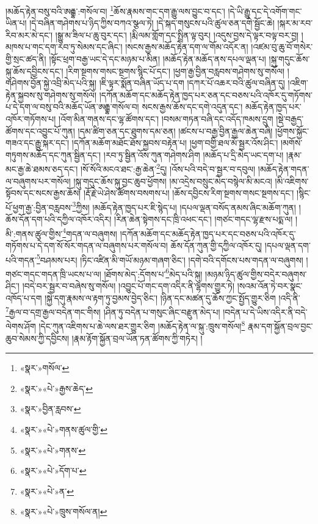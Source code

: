 །མཆོད་རྟེན་བསུ་བའི་ཨརྒྷ་:གསོལ་བ། \footnote{«སྣར་»གསོལ་}ཆོས་རྣམས་གང་དག་རྒྱུ་ལས་བྱུང་བ་དང་། །དེ་ཡི་རྒྱུ་དང་དེ་འགོག་གང་ཡིན་པ། །དེ་བཞིན་གཤེགས་པ་ཉིད་ཀྱིས་བཀའ་སྩལ་ཏེ། །དེ་སྐད་གསུངས་པའི་ཚུལ་ཅན་དགེ་སྦྱོང་ཆེ། །སྐར་མ་རབ་རིབ་མར་མེ་དང་། །སྒྱུ་མ་ཟིལ་པ་ཆུ་བུར་དང་། །རྨི་ལམ་གློག་དང་སྤྲིན་ལྟ་བུར། །འདུས་བྱས་དེ་ལྟར་བལྟ་བར་བྱ། །
མཁས་པ་གང་དག་རབ་ཏུ་སེམས་དང་ཞིང་། །སངས་རྒྱས་མཆོད་རྟེན་དག་ལ་གོམ་འདོར་ན། །འཛམ་བུ་ཆུ་བོ་གསེར་གྱི་སྲང་ཚད་ནི། །སྟོང་ཕྲག་བརྒྱ་ཡང་དེ་དང་མཉམ་པ་མིན། །མཆོད་རྟེན་མཆོད་ནས་དཔལ་ལྡན་པ། །སྐུ་གདུང་ཆོས་སྐུ་ཆོས་དབྱིངས་དང་། །རིག་སྔགས་གསང་སྔགས་སྙིང་པོ་དང་། །ཕྱག་རྒྱ་བྱིན་བརླབས་གཤེགས་སུ་གསོལ། །གཤེགས་བྱོན་སྐྱེ་འབྲི་མེད་པའི་སྐུ། །ཇི་ལྟར་སྨོན་བཞིན་ཡོད་པ་དག །དཀར་པོ་འཆར་བའི་ཚུལ་བཞིན་དུ། །འཇིག་རྟེན་སྐྱབས་སུ་གཤེགས་སུ་གསོལ། །དཀོན་མཆོག་དང་མཆོད་རྟེན་ཁྱད་པར་ཅན་དང་བཅས་པའི་འཁོར་དུ་གཏོགས་པ་དེ་དག་ལ་བསུ་བའི་མཆོད་ཡོན་ཨརྒྷ་གསོལ་བ། སངས་རྒྱས་ཆོས་དང་དགེ་འདུན་དང་། མཆོད་རྟེན་ཁྱད་པར་འཁོར་གཏོགས་པ། །འོག་མིན་གནས་དང་ལྷ་ཚོགས་དང་། །བསམ་གཏན་བཞི་དང་འདོད་ཁམས་དྲུག །སྡེ་བརྒྱད་ཚོགས་དང་འབྱུང་པོ་ཀུན། །དམ་ཚིག་ཅན་དང་ཐུགས་དམ་ཅན། །ཚངས་པ་བརྒྱ་བྱིན་རྒྱལ་ཆེན་བཞི། །ཕྱོགས་སྐྱོང་གཟའ་དང་རྒྱུ་སྐར་དང་། །དཀོན་མཆོག་མཐོང་ཐོས་སྐྱབས་བརྟེན་པ། །ཕྱག་བགྱི་ཐལ་མོ་སྦྱར་འོས་ཤིང་། །མགོས་གཏུགས་མཆོད་དང་ཀུན་སྦྱིན་དང་། །རབ་ཏུ་སྦྱིན་འོས་ཀུན་གཤེགས་ཤིག །མཆོད་པ་དྲི་མེད་ཡང་དག་པ། །རྣམ་མང་རྒྱ་ཆེ་ཐམས་ཅད་དང་། །སོ་སོའི་མངའ་ཐང་:རྒྱ་ཆེན་\footnote{«སྣར་»«པེ་»རྒྱས་ཆེད་}དུ། །འོས་པའི་བདེ་བ་སྦྱར་བ་དབུལ། །མཆོད་རྟེན་གདན་ལ་བཞུགས་པར་གསོལ། །སྐུ་གདུང་ཆོས་སྐུ་བྱང་ཆུབ་ཕྱོགས། །མ་འདྲེས་བསྲུང་མེད་བསྙེལ་མི་མངའ། །མི་འཇིགས་སྟོབས་དང་སངས་རྒྱས་ཆོས། །རྡོ་རྗེ་ཡེ་ཤེས་ཚོགས་བསགས་པ། །ཆོས་དབྱིངས་རིག་སྔགས་གསང་སྔགས་དང་། །སྙིང་པོ་ཕྱག་རྒྱ་:བྱིན་བརླབས་\footnote{«སྣར་»བྱིན་རླབས་}ཀྱིས། །མཆོད་རྟེན་ཁྱད་པར་ཇི་སྙེད་པ། །དཔལ་ལྡན་བསོད་ནམས་ཞིང་མཆོག་ཀུན། །ཆོས་དོན་དག་པའི་དཀྱིལ་འཁོར་འདིར། །རིན་ཆེན་སྟེགས་དང་ཁྲི་འཕང་དང་། །གཙང་གདང་ལྷ་རྫས་པདྨ་ལ། །མི་:གནས་ཚུལ་གྱིས་\footnote{«སྣར་»«པེ་»གནས་ཚུལ་གྱི་}གདན་ལ་བཞུགས། །དཀོན་མཆོག་དང་མཆོད་རྟེན་ཁྱད་པར་དང་བཅས་པའི་འཁོར་དུ་གཏོགས་པ་དེ་དག་སོ་སོར་གདན་ལ་བཞུགས་པར་གསོལ་བ། ཆོས་དོན་ཀུན་གྱི་དཀྱིལ་འཁོར་དུ། །དཔལ་ལྡན་དག་པའི་གདན་\footnote{«སྣར་»«པེ་»གནས་}བཤམས་པར། །ཏིང་འཛིན་མི་གཡོ་མཉམ་གཞག་ཅིང་། །དགེ་བའི་དགོངས་པས་གདན་ལ་བཞུགས། །གཙང་གདང་གདན་ཁྲི་ཡངས་པ་ལ། །ཐོགས་མེད་:དོགས་པ་\footnote{«སྣར་»«པེ་»དོག་པ་}མེད་པའི་སྐུ། །མཉམ་ཉིད་ཚུལ་གྱིས་བདེར་བཞུགས་ཤིང་། །བདེ་བར་སྦྱར་བ་བཞེས་སུ་གསོལ། །འབྱུང་པོ་གང་དག་འདིར་ནི་ལྷགས་གྱུར་ཏེ། །སའམ་འོན་ཏེ་བར་སྣང་འཁོད་པ་དག །སྐྱེ་དགུ་རྣམས་ལ་རྟག་ཏུ་བྱམས་བྱེད་ཅིང་། །ཉིན་དང་མཚན་དུ་ཆོས་ཀྱང་སྤྱོད་གྱུར་ཅིག །འདི་ནི་\footnote{«སྣར་»«པེ་»ན་}རྒྱལ་བ་དགྲ་རྒྱལ་བདེན་གང་གིས། །ཤིན་ཏུ་བདེན་པ་གསུང་ཞིང་བརྫུན་མེད་པ། །བདེན་པ་དེ་ཡིས་འདིར་ནི་བདེ་ལེགས་ཤོག །དེང་ཀུན་འཇིགས་པ་ཆེ་ལས་ཐར་གྱུར་ཅིག །མཆོད་རྟེན་ལ་སྐུ་:ཁྲུས་གསོལ།\footnote{«སྣར་»«པེ་»ཁྲུས་གསོལ་ན།} རྣམ་དག་སྐྱོན་བྲལ་བྱང་ཆུབ་སེམས་ཀྱི་དབྱིངས། །རྣམ་རྟོག་སྐྱོན་བྲལ་ཡོན་ཏན་ཚོགས་ཀྱི་གཏེར། །

